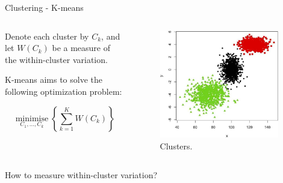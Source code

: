 \begin{frame}[allowframebreaks]{Clustering - K-means}
\begin{columns}
\begin{column}{0.45\textwidth}
    \vspace{1em}

    Denote each cluster by $C_k$, and let $W(C_k)$ be a measure of the within-cluster variation.

    \vspace{1em}

    K-means aims to solve the following optimization problem:

    \vspace{0.5em}

    \begin{equation}
        \operatorname*{minimise}_{C_1, \ldots, C_k} \left\{ \sum_{k=1}^{K} W(C_k) \right\}
    \end{equation}

    \end{column}
    \begin{column}{0.55\textwidth}
        \begin{figure}
            \centering
            \includegraphics[width=0.95\textwidth,keepaspectratio]{images/dul/kmeans/k-means-example-1.jpg}
            \caption{Clusters.}
        \end{figure}
    \end{column}
\end{columns}

\framebreak

\begin{block}{}
    How to measure within-cluster variation? 


\end{block}
\end{frame}
